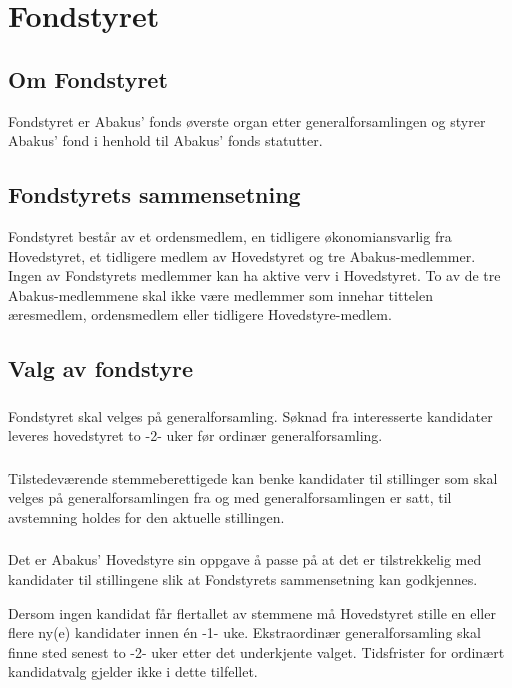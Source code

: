 \section{Fondstyret}
\subsection{Om Fondstyret}
Fondstyret er Abakus’ fonds øverste organ etter generalforsamlingen og styrer
Abakus’ fond i henhold til Abakus’ fonds statutter.

\subsection{Fondstyrets sammensetning}
Fondstyret består av et ordensmedlem, en tidligere økonomiansvarlig fra
Hovedstyret, et tidligere medlem av Hovedstyret og tre Abakus-medlemmer.
Ingen av Fondstyrets medlemmer kan ha aktive verv i Hovedstyret. To av de tre Abakus-medlemmene
skal ikke være medlemmer som innehar tittelen æresmedlem, ordensmedlem eller tidligere Hovedstyre-medlem.

\subsection{Valg av fondstyre}
\subsubsection{}
Fondstyret skal velges på generalforsamling. Søknad fra interesserte kandidater
leveres hovedstyret to -2- uker før ordinær generalforsamling.

\subsubsection{}
Tilstedeværende stemmeberettigede kan benke kandidater til stillinger som skal velges
på generalforsamlingen fra og med generalforsamlingen er satt, til avstemning holdes for
den aktuelle stillingen.

\subsubsection{}
Det er Abakus’ Hovedstyre sin oppgave å passe på at det er tilstrekkelig med kandidater
til stillingene slik at Fondstyrets sammensetning kan godkjennes.

Dersom ingen kandidat får flertallet av stemmene må Hovedstyret stille en eller
flere ny(e) kandidater innen én -1- uke. Ekstraordinær generalforsamling skal
finne sted senest to -2- uker etter det underkjente valget. Tidsfrister for
ordinært kandidatvalg gjelder ikke i dette tilfellet.

